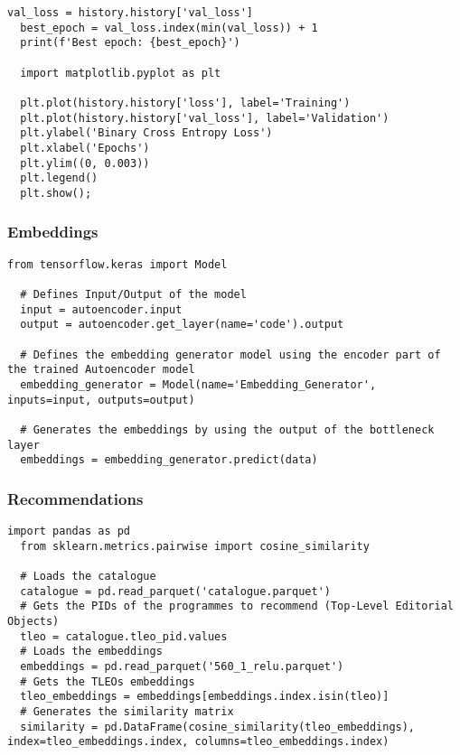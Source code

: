\begin{lstlisting}[caption={Binary cross-entropy loss visualisation},label={lst:loss_visualisation}]
  val_loss = history.history['val_loss']
  best_epoch = val_loss.index(min(val_loss)) + 1
  print(f'Best epoch: {best_epoch}')

  import matplotlib.pyplot as plt

  plt.plot(history.history['loss'], label='Training')
  plt.plot(history.history['val_loss'], label='Validation')
  plt.ylabel('Binary Cross Entropy Loss')
  plt.xlabel('Epochs')
  plt.ylim((0, 0.003))
  plt.legend()
  plt.show();
\end{lstlisting}

\subsubsection{Embeddings}

\begin{lstlisting}[caption={Embeddings generation},label={lst:embeddings}]
  from tensorflow.keras import Model

  # Defines Input/Output of the model
  input = autoencoder.input
  output = autoencoder.get_layer(name='code').output

  # Defines the embedding generator model using the encoder part of the trained Autoencoder model
  embedding_generator = Model(name='Embedding_Generator', inputs=input, outputs=output)

  # Generates the embeddings by using the output of the bottleneck layer
  embeddings = embedding_generator.predict(data)
\end{lstlisting}

\subsubsection{Recommendations}

\begin{lstlisting}[caption={Cosine similarity calculation},label={lst:cosine_similarity}]
  import pandas as pd
  from sklearn.metrics.pairwise import cosine_similarity

  # Loads the catalogue
  catalogue = pd.read_parquet('catalogue.parquet')
  # Gets the PIDs of the programmes to recommend (Top-Level Editorial Objects)
  tleo = catalogue.tleo_pid.values
  # Loads the embeddings
  embeddings = pd.read_parquet('560_1_relu.parquet')
  # Gets the TLEOs embeddings
  tleo_embeddings = embeddings[embeddings.index.isin(tleo)]
  # Generates the similarity matrix
  similarity = pd.DataFrame(cosine_similarity(tleo_embeddings), index=tleo_embeddings.index, columns=tleo_embeddings.index)
\end{lstlisting}

